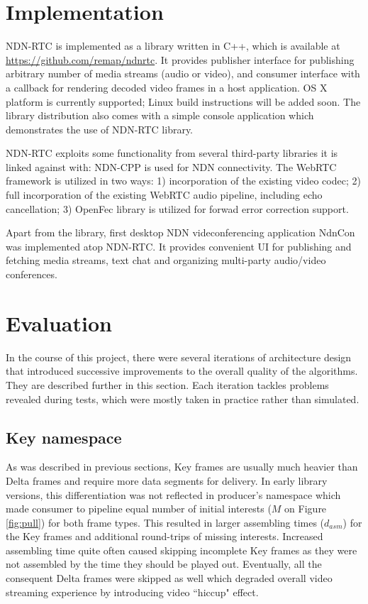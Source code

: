\documentclass{icn/sig-alternate-2012} %
\newcommand{\ndnrtcName}{NDN-RTC} %
\newcommand{\ndnconName}{NdnCon}
\begin{document}
\section{Implementation}
\label{sec:imp}
\ndnrtcName{} is implemented as a library written in C++, which is available at \url{https://github.com/remap/ndnrtc}. 
It provides publisher interface for publishing arbitrary number of media streams (audio or video), and consumer interface with a callback for rendering decoded video frames in a host application. OS X platform is currently supported; Linux build instructions will be added soon. 
The library distribution also comes with a simple console application which demonstrates the use of \ndnrtcName{} library.

\ndnrtcName{} exploits some functionality from several third-party libraries it is linked against with: NDN-CPP \cite{ndnccl} is used for NDN connectivity. The WebRTC framework \cite{webrtc} is utilized in two ways: 1) incorporation of the existing video codec; 2) full incorporation of the existing WebRTC audio pipeline, including echo cancellation;  3) OpenFec \cite{openfec} library is utilized for forwad error correction support.

Apart from the library, first desktop NDN videconferencing application \ndnconName{} \cite{ndncon} was implemented atop \ndnrtcName{}. It provides convenient UI for publishing and fetching media streams, text chat and organizing multi-party audio/video conferences.

\section{Evaluation}
\label{sec:eval} 
In the course of this project, there were several iterations of architecture design that introduced successive improvements to the overall quality of the algorithms. They are described further in this section. Each iteration tackles problems revealed during tests, which were mostly taken in practice rather than simulated.

\subsection{Key namespace}
As was described in previous sections, Key frames are usually much heavier than Delta frames and require more data segments for delivery. In early library versions, this differentiation was not reflected in producer's namespace which made consumer to pipeline equal number of initial interests ($M$ on Figure \ref{fig:pull}) for both frame types. This resulted in larger assembling times ($d_{asm}$) for the Key frames and additional round-trips of missing interests. Increased assembling time quite often caused skipping incomplete Key frames as they were not assembled by the time they should be played out. Eventually, all the consequent Delta frames were skipped as well which degraded overall video streaming experience by introducing video ``hiccup" effect.
\end{document}
